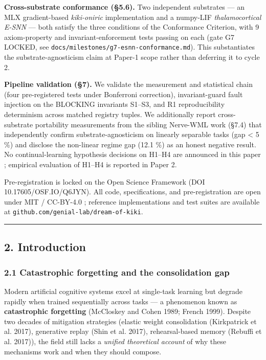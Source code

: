 \documentclass[
]{article}
\begin{document}
\textbf{Cross-substrate conformance (§5.6).} Two independent substrates
--- an MLX gradient-based \emph{kiki-oniric} implementation and a
numpy-LIF \emph{thalamocortical E-SNN} --- both satisfy the three
conditions of the Conformance Criterion, with 9 axiom-property and
invariant-enforcement tests passing on each (gate G7 LOCKED, see
\texttt{docs/milestones/g7-esnn-conformance.md}). This substantiates the
substrate-agnosticism claim at Paper-1 scope rather than deferring it to
cycle 2.

\textbf{Pipeline validation (§7).} We validate the measurement and
statistical chain (four pre-registered tests under Bonferroni
correction), invariant-guard fault injection on the BLOCKING invariants
S1--S3, and R1 reproducibility determinism across matched registry
tuples. We additionally report cross-substrate portability measurements
from the sibling Nerve-WML work (§7.4) that independently confirm
substrate-agnosticism on linearly separable tasks (gap \textless{} 5 \%)
and disclose the non-linear regime gap (12.1 \%) as an honest negative
result. No continual-learning hypothesis decisions on H1--H4 are
announced in this paper ; empirical evaluation of H1--H4 is reported in
Paper 2.

Pre-registration is locked on the Open Science Framework (DOI
10.17605/OSF.IO/Q6JYN). All code, specifications, and pre-registration
are open under MIT / CC-BY-4.0 ; reference implementations and test
suites are available at \texttt{github.com/genial-lab/dream-of-kiki}.

\begin{center}\rule{0.5\linewidth}{0.5pt}\end{center}

\subsection{2. Introduction}\label{introduction}

\subsubsection{2.1 Catastrophic forgetting and the consolidation
gap}\label{catastrophic-forgetting-and-the-consolidation-gap}

Modern artificial cognitive systems excel at single-task learning but
degrade rapidly when trained sequentially across tasks --- a phenomenon
known as \textbf{catastrophic forgetting} (McCloskey and Cohen 1989;
French 1999). Despite two decades of mitigation strategies (elastic
weight consolidation ({Kirkpatrick et al.} 2017), generative replay
(Shin et al. 2017), rehearsal-based memory (Rebuffi et al. 2017)), the
field still lacks a \emph{unified theoretical account} of why these
mechanisms work and when they should compose.
\end{document}
